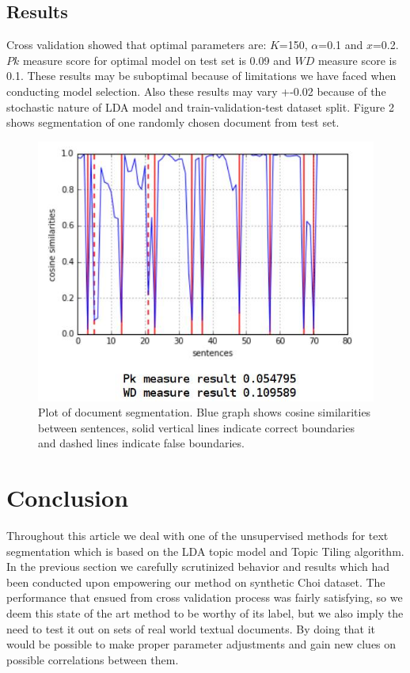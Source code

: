 \documentclass[10pt, a4paper]{article}
\begin{document}
\subsection{Results}
Cross validation showed that optimal parameters are: $K$=150, $\alpha$=0.1 and $x$=0.2. $Pk$ measure score for optimal model on test set is 0.09 and $WD$ measure score is 0.1. These results may be suboptimal because of limitations we have faced when conducting model selection. Also these results may vary +-0.02 because of the stochastic nature of LDA model and train-validation-test dataset split. Figure 2 shows segmentation of one randomly chosen document from test set.

\begin{figure}
\begin{center}
\includegraphics[width=\columnwidth]{plot.png}
\caption{Plot of document segmentation. Blue graph shows cosine similarities between sentences, solid vertical lines indicate correct boundaries and dashed lines indicate false boundaries.}
\label{fig:figure1}
\end{center}
\end{figure}


\section{Conclusion}
Throughout this article we deal with one of the unsupervised methods for text segmentation which is based on the LDA topic model and Topic Tiling algorithm. In the previous section we carefully scrutinized behavior and results which had been conducted upon empowering our method on synthetic Choi dataset. The performance that ensued from cross validation process was fairly satisfying, so we deem this state of the art method to be worthy of its label, but we also imply the need to test it out on sets of real world textual documents. By doing that it would be possible to make proper parameter adjustments and gain new clues on possible correlations between them.



 
\end{document}
